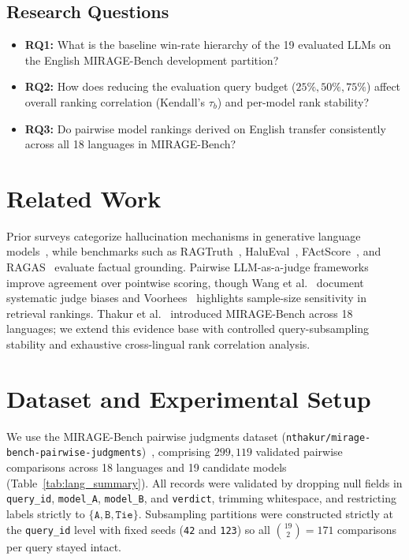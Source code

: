 \documentclass[sigconf]{acmart}
\begin{document}
\subsection{Research Questions}
\begin{itemize}
    \item \textbf{RQ1:} What is the baseline win-rate hierarchy of the 19 evaluated LLMs on the English MIRAGE-Bench development partition?
    \item \textbf{RQ2:} How does reducing the evaluation query budget ($25\%, 50\%, 75\%$) affect overall ranking correlation (Kendall's $\tau_b$) and per-model rank stability?
    \item \textbf{RQ3:} Do pairwise model rankings derived on English transfer consistently across all 18 languages in MIRAGE-Bench?
\end{itemize}

\section{Related Work}
Prior surveys categorize hallucination mechanisms in generative language models~\cite{ji2023survey,huang2025survey}, while benchmarks such as RAGTruth~\cite{niu2024ragtruth}, HaluEval~\cite{li2023halueval}, FActScore~\cite{min2023factscore}, and RAGAS~\cite{es2024ragas} evaluate factual grounding. Pairwise LLM-as-a-judge frameworks~\cite{zheng2023judging,chiang2024chatbot} improve agreement over pointwise scoring, though Wang et al.~\cite{wang2024large} document systematic judge biases and Voorhees~\cite{voorhees2002trec} highlights sample-size sensitivity in retrieval rankings. Thakur et al.~\cite{thakur2024mirage} introduced MIRAGE-Bench across 18 languages; we extend this evidence base with controlled query-subsampling stability and exhaustive cross-lingual rank correlation analysis.

\section{Dataset and Experimental Setup}
We use the MIRAGE-Bench pairwise judgments dataset (\texttt{nthakur/mirage-bench-pairwise-judgments})~\cite{thakur2024mirage}, comprising $299{,}119$ validated pairwise comparisons across 18 languages and 19 candidate models (Table~\ref{tab:lang_summary}). All records were validated by dropping null fields in \texttt{query\_id}, \texttt{model\_A}, \texttt{model\_B}, and \texttt{verdict}, trimming whitespace, and restricting labels strictly to $\{\texttt{A}, \texttt{B}, \texttt{Tie}\}$. Subsampling partitions were constructed strictly at the \texttt{query\_id} level with fixed seeds (\texttt{42} and \texttt{123}) so all $\binom{19}{2} = 171$ comparisons per query stayed intact.
\end{document}
